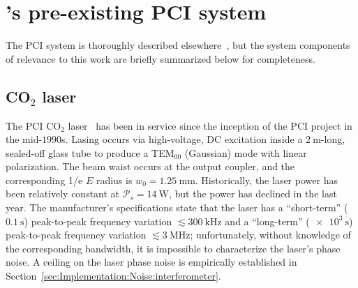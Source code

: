 \section{\diiid's pre-existing PCI system}
\label{sec:Implementation:PCI}
The \diiid \space PCI system is
thoroughly described elsewhere~\cite{dorris_rsi09, dorris_phd}, but
the system components of relevance to this work
are briefly summarized below for completeness.


\subsection{CO$_2$ laser}
\label{sec:Implementation:PCI:laser}
The PCI CO$_2$ laser~\cite[Sec.~3.3]{coda_phd}
has been in service since
the inception of the \diiid\space PCI project in the mid-$1990$s.
Lasing occurs via high-voltage, DC excitation
inside a $\SI{2}{\meter}$-long, sealed-off glass tube
to produce a TEM$_{00}$ (Gaussian) mode with linear polarization.
The beam waist occurs at the output coupler, and
the corresponding 1/e $E$ radius is $w_0 = \SI{1.25}{\milli\meter}$.
Historically, the laser power has been relatively constant
at $\mathcal{P}_s = \SI{14}{\watt}$, but
the power has declined in the last year.
The manufacturer's specifications state that the laser has
a ``short-term'' ($\SI{0.1}{\second}$) peak-to-peak frequency variation
$\lesssim \SI{300}{\kilo\hertz}$ and
a ``long-term'' ($\SI{e3}{\second}$) peak-to-peak frequency variation
$\lesssim \SI{3}{\mega\hertz}$;
unfortunately, without knowledge of the corresponding bandwidth,
it is impossible to characterize the laser's phase noise.
A ceiling on the laser phase noise is empirically established in
Section~\ref{sec:Implementation:Noise:interferometer}.


